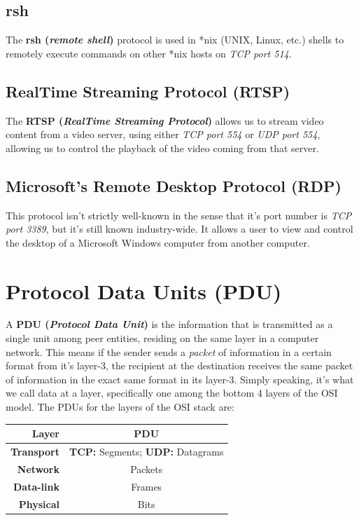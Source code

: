 \subsection{rsh}
The \textbf{rsh (\textit{remote shell})} protocol is used in *nix (UNIX, Linux, etc.) shells to remotely execute commands on other *nix hosts on \textit{TCP port 514}.

\subsection{RealTime Streaming Protocol (RTSP)}
The \textbf{RTSP (\textit{RealTime Streaming Protocol})} allows us to stream video content from a video server, using either \textit{TCP port 554} or \textit{UDP port 554}, allowing us to control the playback of the video coming from that server. 

\subsection{Microsoft's Remote Desktop Protocol (RDP)}
This protocol isn't strictly well-known in the sense that it's port number is \textit{TCP port 3389}, but it's still known industry-wide. It allows a user to view and control the desktop of a Microsoft Windows computer from another computer. 

\section{Protocol Data Units (PDU)}
A \textbf{PDU (\textit{Protocol Data Unit})} is the information that is transmitted as a single unit among peer entities, residing on the same layer in a computer network. This means if the sender sends a \textit{packet} of information in a certain format from it's layer-3, the recipient at the destination receives the same packet of information in the exact same format in its layer-3. Simply speaking, it's what we call data at a layer, specifically one among the bottom 4 layers of the OSI model. The PDUs for the layers of the OSI stack are:

\vspace{-5pt}
\begin{center}
	\begin{tabular}{rc}
		\toprule
		\textbf{Layer}	&\textbf{PDU}\\
		\midrule
		\textbf{Transport}	&\hspace{20pt}\textbf{TCP:} Segments; \hspace{5pt} \textbf{UDP:} Datagrams\\
		\textbf{Network}	&Packets\\
		\textbf{Data-link}	&Frames\\
		\textbf{Physical}	&Bits\\
		\bottomrule
	\end{tabular}
\end{center}
\vspace{-5pt}

